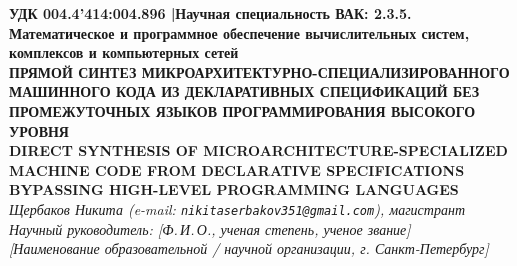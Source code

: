 \documentclass[11pt,a4paper]{article}
\begin{document}
\begin{center}
    {\footnotesize\textbf{\color{accent}УДК 004.4'414:004.896 \quad|\quad Научная специальность ВАК: 2.3.5. Математическое и программное обеспечение вычислительных систем, комплексов и компьютерных сетей}}\\[8pt]
    {\LARGE\textbf{\color{primary}ПРЯМОЙ СИНТЕЗ МИКРОАРХИТЕКТУРНО-СПЕЦИАЛИЗИРОВАННОГО МАШИННОГО КОДА ИЗ ДЕКЛАРАТИВНЫХ СПЕЦИФИКАЦИЙ БЕЗ ПРОМЕЖУТОЧНЫХ ЯЗЫКОВ ПРОГРАММИРОВАНИЯ ВЫСОКОГО УРОВНЯ}}\\[6pt]
    {\large\textbf{\color{accent}DIRECT SYNTHESIS OF MICROARCHITECTURE-SPECIALIZED MACHINE CODE FROM DECLARATIVE SPECIFICATIONS BYPASSING HIGH-LEVEL PROGRAMMING LANGUAGES}}\\[10pt]
    {\normalsize\textit{Щербаков Никита (e-mail: \texttt{nikitaserbakov351@gmail.com}), магистрант}}\\
    {\small\textit{Научный руководитель: [Ф.\,И.\,О., ученая степень, ученое звание]}}\\
    {\small\textit{[Наименование образовательной / научной организации, г. Санкт-Петербург]}}
\end{center}
\end{document}
